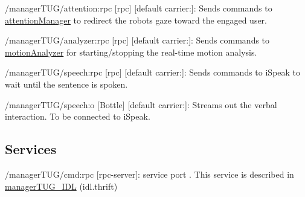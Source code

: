 \begin{DoxyItemize}
\item /manager\+T\+U\+G/attention\+:rpc \mbox{[}rpc\mbox{]} \mbox{[}default carrier\+:\mbox{]}\+: Sends commands to \mbox{\hyperlink{group__attentionManager}{attention\+Manager}} to redirect the robot\textquotesingle{}s gaze toward the engaged user.
\item /manager\+T\+U\+G/analyzer\+:rpc \mbox{[}rpc\mbox{]} \mbox{[}default carrier\+:\mbox{]}\+: Sends commands to \mbox{\hyperlink{group__motionAnalyzer}{motion\+Analyzer}} for starting/stopping the real-\/time motion analysis.
\item /manager\+T\+U\+G/speech\+:rpc \mbox{[}rpc\mbox{]} \mbox{[}default carrier\+:\mbox{]}\+: Sends commands to i\+Speak to wait until the sentence is spoken.
\item /manager\+T\+U\+G/speech\+:o \mbox{[}Bottle\mbox{]} \mbox{[}default carrier\+:\mbox{]}\+: Streams out the verbal interaction. To be connected to i\+Speak.
\end{DoxyItemize}\hypertarget{group__skeletonViewer_services_sec}{}\subsection{Services}\label{group__skeletonViewer_services_sec}

\begin{DoxyItemize}
\item /manager\+T\+U\+G/cmd\+:rpc \mbox{[}rpc-\/server\mbox{]}\+: service port . This service is described in \mbox{\hyperlink{classmanagerTUG__IDL}{manager\+T\+U\+G\+\_\+\+I\+DL}} (idl.\+thrift) 
\end{DoxyItemize}